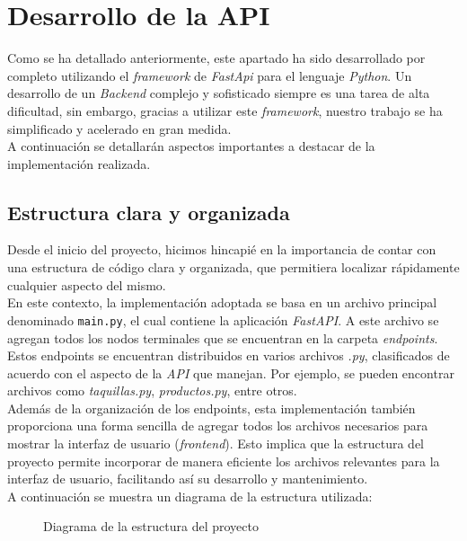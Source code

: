 \documentclass[12pt]{report}
\begin{document}
\chapter{Desarrollo de la API}
Como se ha detallado anteriormente, este apartado ha sido desarrollado por completo utilizando el \textit{framework} de \textit{FastApi} para el lenguaje \textit{Python}. Un desarrollo de un \textit{Backend} complejo y sofisticado siempre es una tarea de alta dificultad, sin embargo, gracias a utilizar este \textit{framework}, nuestro trabajo se ha simplificado y acelerado en gran medida.
\\
A continuación se detallarán aspectos importantes a destacar de la implementación realizada.
\section{Estructura clara y organizada}
Desde el inicio del proyecto, hicimos hincapié en la importancia de contar con una estructura de código clara y organizada, que permitiera localizar rápidamente cualquier aspecto del mismo.
\\

En este contexto, la implementación adoptada se basa en un archivo principal denominado \texttt{main.py}, el cual contiene la aplicación \textit{FastAPI}. A este archivo se agregan todos los nodos terminales que se encuentran en la carpeta \textit{endpoints}. Estos endpoints se encuentran distribuidos en varios archivos \textit{.py}, clasificados de acuerdo con el aspecto de la \textit{API} que manejan. Por ejemplo, se pueden encontrar archivos como \textit{taquillas.py}, \textit{productos.py}, entre otros.
\\

Además de la organización de los endpoints, esta implementación también proporciona una forma sencilla de agregar todos los archivos necesarios para mostrar la interfaz de usuario (\emph{frontend}). Esto implica que la estructura del proyecto permite incorporar de manera eficiente los archivos relevantes para la interfaz de usuario, facilitando así su desarrollo y mantenimiento.
\\

A continuación se muestra un diagrama de la estructura utilizada:
\begin{figure}[H]
    \centering
{}
\caption{Diagrama de la estructura del proyecto}
\label{fig:arbol_estructura}
\end{figure}
\end{document}
